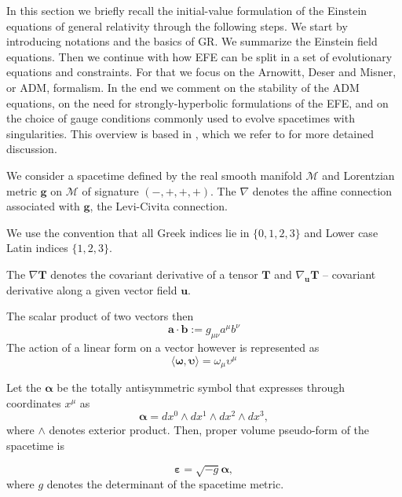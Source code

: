 \documentclass[11pt,a4paper,headinclude=true,DIV=14,BCOR=8mm,chapterprefix,listof=totoc,twoside,openright,abstracton]{scrbook}
\begin{document}
In this section we briefly recall the initial-value formulation of the Einstein equations of general relativity through the following steps. We start by introducing notations and the basics of GR. We summarize the Einstein field equations. Then we continue with how EFE can be split in a set of evolutionary equations and constraints. For that we focus on the Arnowitt, Deser and Misner, or ADM, formalism. In the end we comment on the stability of the ADM equations, on the need for strongly-hyperbolic formulations of the EFE, and on the choice of gauge conditions commonly used to
evolve spacetimes with singularities. This overview is based in \cite{Arnowitt:1962hi,Landau:1982dva,Wald:1984,Misner:1973,Baumgarte:2002jm}, which we refer to for more detained discussion.

We consider a spacetime defined by the real smooth manifold $\mathcal{M}$ and Lorentzian metric $\boldsymbol{g}$ on $\mathcal{M}$ of signature $(-,+,+,+)$. The $\nabla$ denotes the affine connection associated with $\boldsymbol{g}$, the Levi-Civita connection. 

We use the convention that all Greek indices lie in $\{0, 1, 2, 3\}$ and Lower case Latin indices $\{1, 2, 3\}$. 

The $\nabla\boldsymbol{T}$ denotes the covariant derivative of a tensor $\boldsymbol{T}$ and $\nabla_{\boldsymbol{u}}\boldsymbol{T}$ -- covariant derivative along a given vector field $\boldsymbol{u}$.

The scalar product of two vectors then 
\begin{equation*}
    \boldsymbol{a}\cdot\boldsymbol{b}:=g_{\mu\nu}a^{\mu}b^{\nu}
\end{equation*}
The action of a linear form on a vector however is represented as 
\begin{equation*}
    \langle\boldsymbol{\omega},\boldsymbol{\upsilon}\rangle=\omega_{\mu}\upsilon^{\mu}
\end{equation*}

Let the $\boldsymbol{\alpha}$ be the totally antisymmetric symbol that expresses through coordinates $x^{\mu}$ as
\begin{equation*}
    \boldsymbol{\alpha} = dx^0 \wedge dx^1 \wedge dx^2 \wedge dx^3,
\end{equation*}
where $\wedge$ denotes exterior product. Then, proper volume pseudo-form of the spacetime is

\begin{equation*}
    \boldsymbol{\varepsilon} = \sqrt{-g}\boldsymbol{\alpha},
\end{equation*}
where $g$ denotes the determinant of the spacetime metric. 
\end{document}
